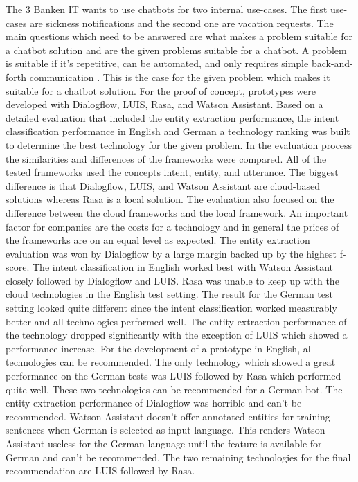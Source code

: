 The 3 Banken IT wants to use chatbots for two internal use-cases.
The first use-cases are sickness notifications and the second one 
are vacation requests.
The main questions which need to be answered are 
what makes a problem suitable for a chatbot solution and are the given 
problems suitable for a chatbot.
A problem is suitable if it's repetitive, can be automated, and 
only requires simple back-and-forth communication \citet{buiildChatbotsPython}.
This is the case for the given problem which makes it suitable for a
chatbot solution.
For the proof of concept, prototypes were developed with Dialogflow, LUIS, Rasa, 
and Watson Assistant.
Based on a detailed evaluation that included the entity extraction performance, 
the intent classification performance in English and German a technology ranking 
was built to determine the best technology for the given problem.
In the evaluation process the similarities and differences of the 
frameworks were compared.
All of the tested frameworks used the concepts intent, entity, and utterance.
The biggest difference is that Dialogflow, LUIS, and Watson Assistant are 
cloud-based solutions whereas Rasa is a local solution.
The evaluation also focused on the difference between the cloud frameworks and the 
local framework.
An important factor for companies are the costs for a technology and in general the 
prices of the frameworks are on an equal level as expected.
The entity extraction evaluation was won by Dialogflow by a large margin backed up 
by the highest f-score.
The intent classification in English worked best with Watson Assistant closely followed 
by Dialogflow and LUIS.
Rasa was unable to keep up with the cloud technologies in the English test setting.
The result for the German test setting looked quite different since the 
intent classification worked measurably better and all technologies 
performed well.
The entity extraction performance of the technology dropped significantly with the 
exception of LUIS which showed a performance increase.
For the development of a prototype in English, all technologies can be recommended.
The only technology which showed a great performance on the 
German tests was LUIS followed by Rasa which performed quite well.
These two technologies can be recommended for a German bot.
The entity extraction performance of Dialogflow was horrible and can't be
recommended.
Watson Assistant doesn't offer annotated entities for training sentences when German 
is selected as input language.
This renders Watson Assistant useless for the German language until the feature is 
available for German and can't be recommended.
The two remaining technologies for the final recommendation are LUIS followed by Rasa.  